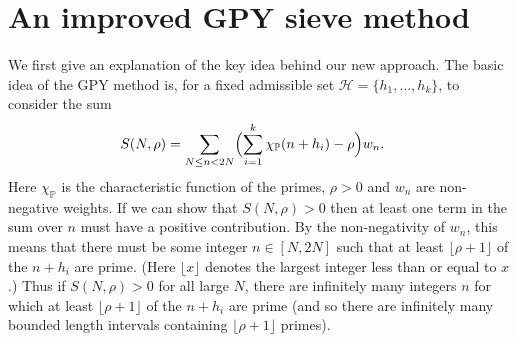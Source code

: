 \documentclass[12pt,a4paper]{amsart}
\theoremstyle{plain}
\numberwithin{sblmm}{thrm}
\numberwithin{equation}{section}
\renewcommand{\phi}{\varphi}
\begin{document}

\section{An improved GPY sieve method}
We first give an explanation of the key idea behind our new approach. The basic idea of the GPY method is, for a fixed admissible set $\mathcal{H}=\{h_1,\dotsc,h_k\}$, to consider the sum
\begin{align}
S(N,\rho)&=\sum_{N\le n<2N}\Bigl(\sum_{i=1}^k\chi_{\mathbb{P}}(n+h_i)-\rho\Bigr)w_n.\label{eq:BasicSum}
\end{align}
Here $\chi_{\mathbb{P}}$ is the characteristic function of the primes, $\rho>0$ and $w_n$ are non-negative weights. If we can show that $S(N,\rho)>0$ then at least one term in the sum over $n$ must have a positive contribution. By the non-negativity of $w_n$, this means that there must be some integer $n\in[N,2N]$ such that at least $\lfloor\rho+1\rfloor$ of the $n+h_i$ are prime. (Here $\lfloor x\rfloor$ denotes the largest integer less than or equal to $x$.) Thus if $S(N,\rho)>0$ for all large $N$, there are infinitely many integers $n$ for which at least $\lfloor\rho+1\rfloor$ of the $n+h_i$ are prime (and so there are infinitely many bounded length intervals containing $\lfloor\rho+1\rfloor$ primes).
\end{document}
